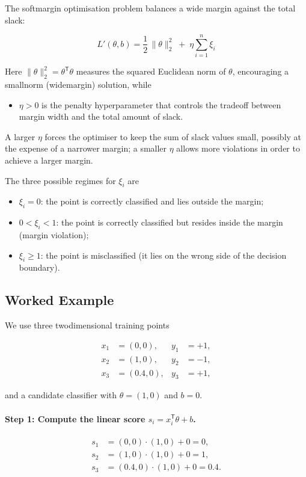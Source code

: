\documentclass[12pt, a4paper]{article}
\begin{document}
The softmargin optimisation problem balances a wide margin against the total slack:

\[
\boxed{\;L'(\theta,b)=\frac{1}{2}\,\|\theta\|_2^{2}\;+\;\eta\sum_{i=1}^{n}\xi_i\;}
\]

Here \(\|\theta\|_2^{2}= \theta^{\mathsf T}\theta\) measures the squared Euclidean norm of \(\theta\), encouraging a smallnorm (widemargin) solution, while  

\begin{itemize}
\item \(\eta>0\) is the penalty hyperparameter that controls the tradeoff between margin width and the total amount of slack.  
\end{itemize}

A larger \(\eta\) forces the optimiser to keep the sum of slack values small, possibly at the expense of a narrower margin; a smaller \(\eta\) allows more violations in order to achieve a larger margin.

The three possible regimes for \(\xi_i\) are  

\begin{itemize}
\item \(\xi_i = 0\): the point is correctly classified and lies outside the margin;  
\item \(0<\xi_i<1\): the point is correctly classified but resides inside the margin (margin violation);  
\item \(\xi_i \ge 1\): the point is misclassified (it lies on the wrong side of the decision boundary).
\end{itemize}

\subsection{Worked Example}  
We use three twodimensional training points  

\[
\begin{aligned}
x_1 &= (0,0), & y_1 &= +1,\\
x_2 &= (1,0), & y_2 &= -1,\\
x_3 &= (0.4,0), & y_3 &= +1,
\end{aligned}
\]

and a candidate classifier with \(\theta=(1,0)\) and \(b=0\).

\paragraph{Step 1: Compute the linear score \(s_i = x_i^{\mathsf T}\theta + b\).}
\[
\begin{aligned}
s_1 &= (0,0)\!\cdot\!(1,0)+0 = 0,\\
s_2 &= (1,0)\!\cdot\!(1,0)+0 = 1,\\
s_3 &= (0.4,0)\!\cdot\!(1,0)+0 = 0.4.
\end{aligned}
\]
\end{document}
